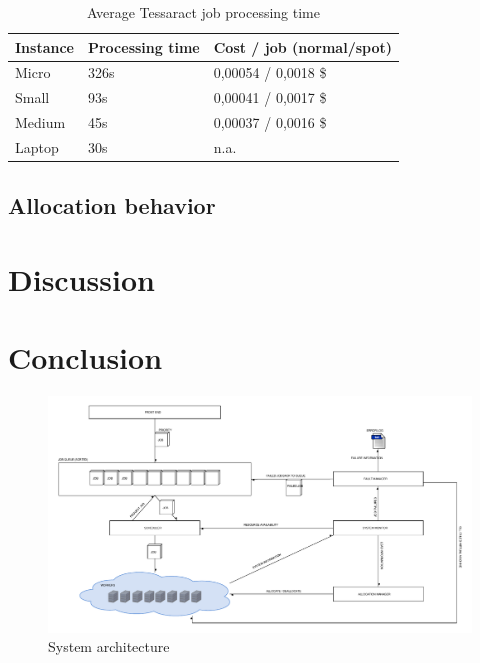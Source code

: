 \documentclass[a4paper]{IEEEtran}
\begin{document}
\begin{table}
\centering

\begin{tabular}{| l | l | l |}
\hline
Instance & Processing time & Cost / job (normal/spot) \\ \hline
Micro & 326s & 0,00054 / 0,0018 \$ \\ \hline
Small & 93s & 0,00041 / 0,0017 \$ \\ \hline
Medium & 45s & 0,00037 / 0,0016 \$ \\ \hline
Laptop & 30s & n.a. \\ \hline
\end{tabular}

\caption{Average Tessaract job processing time}
\label{tesperfresults}
\end{table}

\subsection{Allocation behavior}

\section{Discussion}

\section{Conclusion}

\begin{thebibliography}{9}

 
\end{thebibliography}


\newpage

\begin{landscape}
\appendix

\begin{figure}[h]
\centering
\includegraphics[width=700pt]{"System Architecture 2"}
\caption{System architecture}
\label{fig_sysarch}
\end{figure}
\end{landscape}
\clearpage
\end{document}
